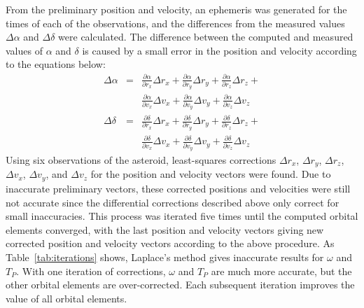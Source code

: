 \documentclass[12pt,journal,compsoc]{IEEEtran}
\begin{document}
From the preliminary position and velocity, 
an ephemeris was generated for the times of each of the observations, 
and the differences from the measured values $\Delta \alpha$ and $\Delta \delta$ were calculated.
The difference between the computed and measured values of $\alpha$ and $\delta$ 
is caused by a small error in the position and velocity according to the equations below:
\begin{eqnarray*}
\Delta \alpha &=& \frac{\partial \alpha}{\partial r_x} \Delta r_x + \frac{\partial \alpha}{\partial r_y} \Delta r_y + \frac{\partial \alpha}{\partial r_z} \Delta r_z + \\& &
\frac{\partial \alpha}{\partial v_x} \Delta v_x + \frac{\partial \alpha}{\partial v_y} \Delta v_y + \frac{\partial \alpha}{\partial v_z} \Delta v_z \\
\Delta \delta &=& \frac{\partial \delta}{\partial r_x} \Delta r_x + \frac{\partial \delta}{\partial r_y} \Delta r_y + \frac{\partial \delta}{\partial r_z} \Delta r_z + \\& &
\frac{\partial \delta}{\partial v_x} \Delta v_x + \frac{\partial \delta}{\partial v_y} \Delta v_y + \frac{\partial \delta}{\partial v_z} \Delta v_z
\end{eqnarray*}
Using six observations of the asteroid, 
least-squares corrections $\Delta r_x$, $\Delta r_y$, $\Delta r_z$, $\Delta v_x$, $\Delta v_y$, and $\Delta v_z$ 
for the position and velocity vectors were found.
Due to inaccurate preliminary vectors, 
these corrected positions and velocities were still not accurate since the differential corrections described above 
only correct for small inaccuracies.
This process was iterated five times until the computed orbital elements converged,
with the last position and velocity vectors giving new corrected position and velocity vectors according to the 
above procedure. 
As Table~\ref{tab:iterations} shows, 
Laplace's method gives inaccurate results for $\omega$ and $T_P$.
With one iteration of corrections, $\omega$ and $T_P$ are much more accurate, but the other orbital elements
are over-corrected. Each subsequent iteration improves the value of all orbital elements.
\end{document}

